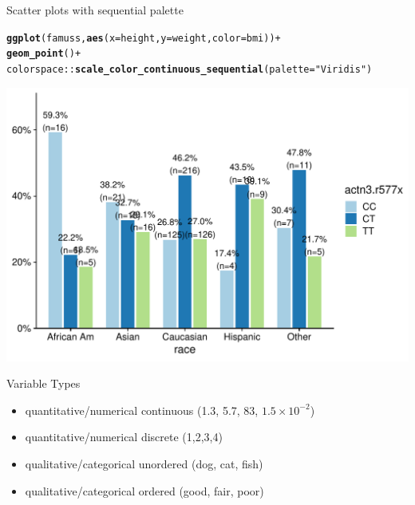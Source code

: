 \documentclass[10pt,handout]{beamer}\usepackage[]{graphicx}\usepackage[]{color}
\makeatletter
\def\maxwidth{ %
  \ifdim\Gin@nat@width>\linewidth
    \linewidth
  \else
    \Gin@nat@width
  \fi
}
\newcommand{\hlstr}[1]{\textcolor[rgb]{0.192,0.494,0.8}{#1}}%
\newcommand{\hlopt}[1]{\textcolor[rgb]{0,0,0}{#1}}%
\newcommand{\hlstd}[1]{\textcolor[rgb]{0.345,0.345,0.345}{#1}}%
\newcommand{\hlkwc}[1]{\textcolor[rgb]{0.333,0.667,0.333}{#1}}%
\newcommand{\hlkwd}[1]{\textcolor[rgb]{0.737,0.353,0.396}{\textbf{#1}}}%
\newenvironment{kframe}{%
 \def\at@end@of@kframe{}%
 \ifinner\ifhmode%
  \def\at@end@of@kframe{\end{minipage}}%
  \begin{minipage}{\columnwidth}%
 \fi\fi%
 \def\FrameCommand##1{\hskip\@totalleftmargin \hskip-\fboxsep
 \colorbox{shadecolor}{##1}\hskip-\fboxsep
     \hskip-\linewidth \hskip-\@totalleftmargin \hskip\columnwidth}%
 \MakeFramed {\advance\hsize-\width
   \@totalleftmargin\z@ \linewidth\hsize
   \@setminipage}}%
 {\par\unskip\endMakeFramed%
 \at@end@of@kframe}
\newenvironment{knitrout}{}{} %
\makeatother
\begin{document}
	\begin{frame}[fragile]{Scatter plots with sequential palette}
\begin{knitrout}\tiny
{}\color{fgcolor}\begin{kframe}
\begin{alltt}
\hlkwd{ggplot}\hlstd{(famuss,} \hlkwd{aes}\hlstd{(}\hlkwc{x} \hlstd{= height,} \hlkwc{y} \hlstd{= weight,} \hlkwc{color} \hlstd{= bmi))} \hlopt{+}
\hlkwd{geom_point}\hlstd{()} \hlopt{+}
\hlstd{colorspace}\hlopt{::}\hlkwd{scale_color_continuous_sequential}\hlstd{(}\hlkwc{palette} \hlstd{=} \hlstr{"Viridis"}\hlstd{)}
\end{alltt}
\end{kframe}

{\centering \includegraphics[width=\maxwidth]{figure/unnamed-chunk-3-1} 

}



\end{knitrout}
\end{frame}



\begin{frame}{Variable Types}
	\begin{itemize}
		\setlength\itemsep{1.5em}
		\item quantitative/numerical continuous (1.3, 5.7, 83, $1.5\times 10^{-2}$)
		\item quantitative/numerical discrete (1,2,3,4)
		\item qualitative/categorical unordered (dog, cat, fish)
		\item qualitative/categorical ordered (good, fair, poor)
	\end{itemize}
	
	
	
\end{frame}
\end{document}
